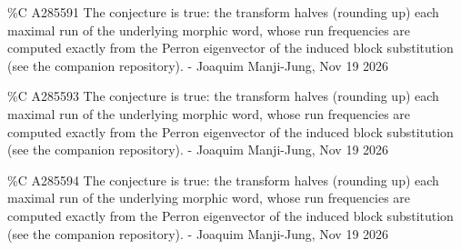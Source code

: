 {\%C A285591 The conjecture is true: the transform halves (rounding up) each maximal run of the underlying morphic word, whose run frequencies are computed exactly from the Perron eigenvector of the induced block substitution (see the companion repository). - Joaquim Manji-Jung, Nov 19 2026\par
\%C A285593 The conjecture is true: the transform halves (rounding up) each maximal run of the underlying morphic word, whose run frequencies are computed exactly from the Perron eigenvector of the induced block substitution (see the companion repository). - Joaquim Manji-Jung, Nov 19 2026\par
\%C A285594 The conjecture is true: the transform halves (rounding up) each maximal run of the underlying morphic word, whose run frequencies are computed exactly from the Perron eigenvector of the induced block substitution (see the companion repository). - Joaquim Manji-Jung, Nov 19 2026\par
}

